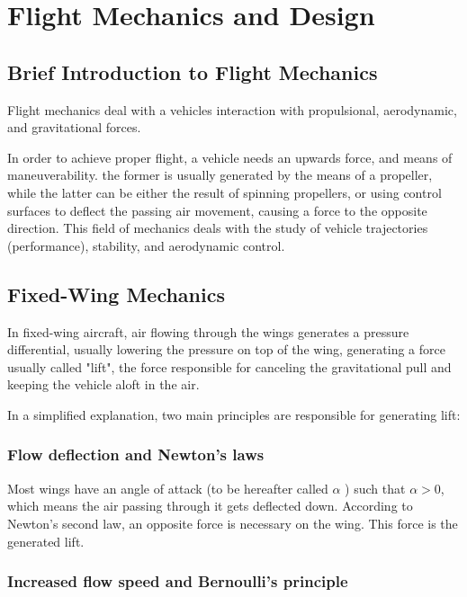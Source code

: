 
\chapter{Flight Mechanics and Design} \label{chap:FlightMechanics}

\section{Brief Introduction to Flight Mechanics}

Flight mechanics deal with a vehicles interaction with propulsional, aerodynamic, and gravitational forces.

In order to achieve proper flight, a vehicle needs an upwards force, and means of maneuverability. the former is usually generated by the means of a propeller, while the latter can be either the result of spinning propellers, or using control surfaces to deflect the passing air movement, causing a force to the opposite direction. 
%
This field of mechanics deals with the study of vehicle trajectories (performance), stability, and aerodynamic
control.


\section{Fixed-Wing Mechanics}

In fixed-wing aircraft, air flowing through the wings generates a pressure differential, usually lowering the pressure on top of the wing, generating a force usually called "lift", the force responsible for canceling the gravitational pull and keeping the vehicle aloft in the air.

In a simplified explanation, two main principles are responsible for generating lift:

\subsection{Flow deflection and Newton's laws}

Most wings have an angle of attack (to be hereafter called $\alpha$ ) such that $\alpha > 0$, which means the air passing through it gets deflected down. According to Newton's second law, an opposite force is necessary on the wing. This force is the generated lift.

\subsection{Increased flow speed and Bernoulli's principle}

